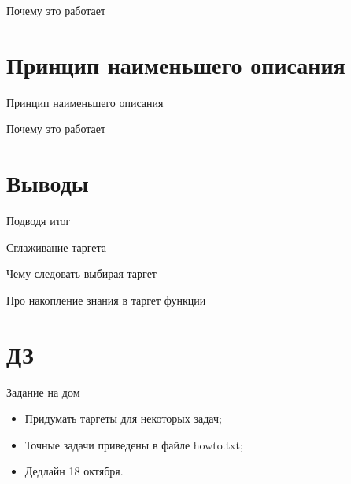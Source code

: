 \documentclass[14pt, fleqn, xcolor={dvipsnames, table}]{beamer}
\begin{document}
\begin{frame}{Почему это работает} %
\end{frame}

\section{Принцип наименьшего описания}

\begin{frame}{Принцип наименьшего описания}
\end{frame}

\begin{frame}{Почему это работает} %
\end{frame}

\section{Выводы}
\begin{frame}{Подводя итог}
\end{frame}

\begin{frame}{Сглаживание таргета}
\end{frame}

\begin{frame}{Чему следовать выбирая таргет}
\end{frame}

\begin{frame}{Про накопление знания в таргет функции}
\end{frame}

\section{ДЗ}
\begin{frame}{Задание на дом}
\begin{itemize}
  \item Придумать таргеты для некоторых задач; 
  \item Точные задачи приведены в файле howto.txt; 
  \item Дедлайн 18 октября.
\end{itemize}

\end{frame}
\end{document}

